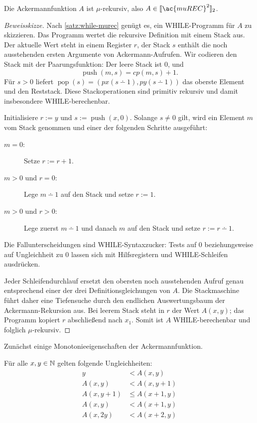 \begin{Satz}\label{satz:ackermann-murec}
  Die Ackermannfunktion $A$ ist $\mu$-rekursiv, also
  $A\in\llbracket\ac{muREC}^2\rrbracket_2$.
\end{Satz}
\begin{proof}[Beweisskizze]
  Nach \autoref{satz:while-murec} genügt es, ein WHILE-Programm für $A$ zu
  skizzieren. Das Programm wertet die rekursive Definition mit einem Stack aus.
  Der aktuelle Wert steht in einem Register $r$, der Stack $s$ enthält die noch
  ausstehenden ersten Argumente von Ackermann-Aufrufen. Wir codieren den Stack
  mit der Paarungsfunktion: Der leere Stack ist $0$, und
  \[
    \operatorname{push}(m,s)=cp(m,s)+1.
  \]
  Für $s>0$ liefert
  $\operatorname{pop}(s)=(px(s\dotminus1),py(s\dotminus1))$ das oberste Element
  und den Reststack. Diese Stackoperationen sind primitiv rekursiv und damit
  insbesondere WHILE-berechenbar.

  Initialisiere $r:=y$ und $s:=\operatorname{push}(x,0)$. Solange $s\ne0$ gilt,
  wird ein Element $m$ vom Stack genommen und einer der folgenden Schritte
  ausgeführt:
  \begin{description}
  \item[$m=0$:] Setze $r:=r+1$.
  \item[$m>0$ und $r=0$:] Lege $m\dotminus1$ auf den Stack und setze $r:=1$.
  \item[$m>0$ und $r>0$:] Lege zuerst $m\dotminus1$ und danach $m$ auf den
    Stack und setze $r:=r\dotminus1$.
  \end{description}
  Die Fallunterscheidungen sind WHILE-Syntaxzucker: Tests auf $0$ beziehungsweise
  auf Ungleichheit zu $0$ lassen sich mit Hilfsregistern und WHILE-Schleifen
  ausdrücken.

  Jeder Schleifendurchlauf ersetzt den obersten noch ausstehenden Aufruf genau
  entsprechend einer der drei Definitionsgleichungen von $A$. Die Stackmaschine
  führt daher eine Tiefensuche durch den endlichen Auswertungsbaum der
  Ackermann-Rekursion aus. Bei leerem Stack steht in $r$ der Wert $A(x,y)$; das
  Programm kopiert $r$ abschließend nach $x_1$. Somit ist $A$ WHILE-berechenbar
  und folglich $\mu$-rekursiv.
\end{proof}
Zunächst einige Monotonieeigenschaften der Ackermannfunktion.
\begin{lemma}
  Für alle $x, y \in \mathbb{N}$ gelten folgende Ungleichheiten:
  \begin{align*}
    y &< A (x, y) \\
    A(x,y) & < A(x, y+1) \\
    A(x, y+1) & \le A (x+1, y) \\
    A (x, y) & < A (x+1, y) \\
    A (x, 2y) & < A (x+2, y)
  \end{align*}
\end{lemma}
